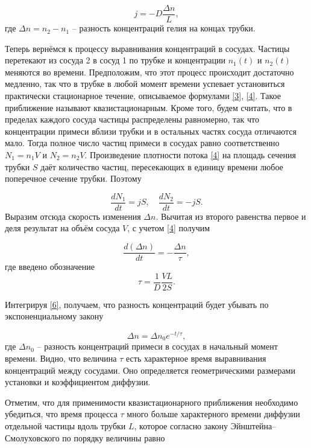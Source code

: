 \documentclass[a4paper, 12pt]{article}
\begin{document}
\begin{equation}\label{4}
j=-D\frac{\Delta n}{L},
\end{equation}
где $ \Delta n = n_2-n_1 $ -- разность концентраций гелия на концах трубки.

Теперь вернёмся к процессу выравнивания концентраций в сосудах. Частицы перетекают из сосуда 2 в сосуд 1 по трубке и концентрации $ n_1(t) $ и $ n_2(t) $ меняются во времени. Предположим, что этот процесс происходит достаточно медленно, так что в трубке в любой момент времени успевает установиться практически стационарное течение, описываемое формулами \eqref{3}, \eqref{4}. Такое приближение называют квазистационарным. Кроме того, будем считать, что в пределах каждого сосуда частицы распределены равномерно, так что концентрации примеси вблизи трубки и в остальных частях сосуда отличаются мало. Тогда полное число частиц примеси в сосудах равно соответственно $ N_1=n_1V $ и $ N_2=n_2V $. Произведение плотности потока \eqref{4} на площадь сечения трубки $ S $ даёт количество частиц, пересекающих в единицу времени любое поперечное сечение трубки. Поэтому

\begin{equation}\label{5}
\frac{dN_1}{dt}=jS, \quad \frac{dN_2}{dt}=-jS.
\end{equation}
Выразим отсюда скорость изменения $ \Delta n $. Вычитая из второго равенства первое и деля результат на объём сосуда $ V $, с учетом \eqref{4} получим

\begin{equation}\label{6}
\frac{d(\Delta n)}{dt}=-\frac{\Delta n}{\tau},
\end{equation}
где введено обозначение
\begin{equation}\label{7}
\tau=\frac{1}{D}\frac{VL}{2S}.
\end{equation}

Интегрируя \eqref{6}, получаем, что разность концентраций будет убывать по экспоненциальному закону

\begin{equation}\label{8}
\Delta n = \Delta n_0 e^{-t/\tau},
\end{equation}
где $ \Delta n_0 $ -- разность концентраций примеси в сосудах в начальный момент времени. Видно, что величина $ \tau $ есть характерное время выравнивания концентраций между сосудами. Оно определяется геометрическими размерами установки и коэффициентом диффузии.

Отметим, что для применимости квазистационарного приближения необходимо убедиться, что время процесса $ \tau $ много больше характерного времени диффузии отдельной частицы вдоль трубки $ L $, которое согласно закону Эйнштейна–Смолуховского по порядку величины равно
\end{document}
